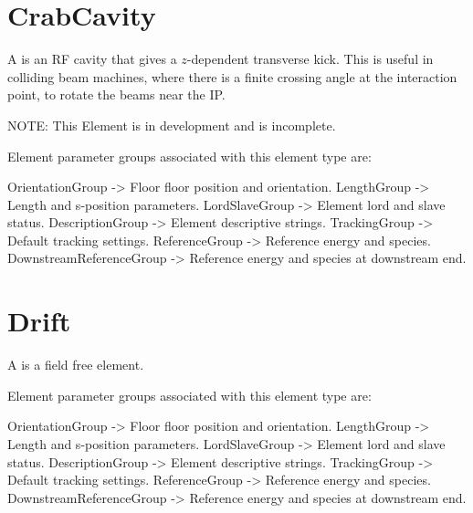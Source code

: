 \section{CrabCavity}
\label{s:crabcavity}

A  is an RF cavity that gives a $z$-dependent transverse kick. 
This is useful in colliding beam machines, where there is a finite crossing angle at the 
interaction point, to rotate the beams near the IP.

NOTE: This Element is in development and is incomplete.

Element parameter groups associated with this element type are:
\TOPrule
\begin{example}
  OrientationGroup -> Floor floor position and orientation.  
  LengthGroup        -> Length and s-position parameters.  
  LordSlaveGroup     -> Element lord and slave status.  
  DescriptionGroup   -> Element descriptive strings.  
  TrackingGroup      -> Default tracking settings.  
  ReferenceGroup     -> Reference energy and species. 
  DownstreamReferenceGroup -> Reference energy and species at downstream end. 
\end{example}
\BOTTOMrule


\section{Drift}
\label{s:drift}

A  is a field free element.

Element parameter groups associated with this element type are:
\TOPrule
\begin{example}
  OrientationGroup -> Floor floor position and orientation.  
  LengthGroup        -> Length and s-position parameters.  
  LordSlaveGroup     -> Element lord and slave status.  
  DescriptionGroup   -> Element descriptive strings.  
  TrackingGroup      -> Default tracking settings.  
  ReferenceGroup     -> Reference energy and species. 
  DownstreamReferenceGroup -> Reference energy and species at downstream end. 
\end{example}
\BOTTOMrule

